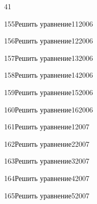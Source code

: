 \begin{TrigSourcePage}{41}
\begin{TrigExercise}{155}{Решить уравнение}{11}{2006}
\end{TrigExercise}
\begin{TrigExercise}{156}{Решить уравнение}{12}{2006}
\end{TrigExercise}
\begin{TrigExercise}{157}{Решить уравнение}{13}{2006}
\end{TrigExercise}
\begin{TrigExercise}{158}{Решить уравнение}{14}{2006}
\end{TrigExercise}
\begin{TrigExercise}{159}{Решить уравнение}{15}{2006}
\end{TrigExercise}
\begin{TrigExercise}{160}{Решить уравнение}{16}{2006}
\end{TrigExercise}
\begin{TrigExercise}{161}{Решить уравнение}{1}{2007}
\end{TrigExercise}
\begin{TrigExercise}{162}{Решить уравнение}{2}{2007}
\end{TrigExercise}
\begin{TrigExercise}{163}{Решить уравнение}{3}{2007}
\end{TrigExercise}
\begin{TrigExercise}{164}{Решить уравнение}{4}{2007}
\end{TrigExercise}
\begin{TrigExercise}{165}{Решить уравнение}{5}{2007}

\end{TrigExercise}
\end{TrigSourcePage}
